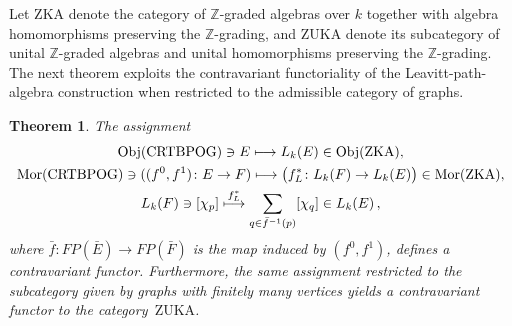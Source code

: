 \documentclass[12pt,times,a4paper]{amsart}
\newtheorem{theorem}{Theorem}[section]
\numberwithin{equation}{section}
\numberwithin{equation}{section}
\begin{document}
Let $\mathrm{ZKA}$ denote the category of $\mathbb{Z}$-graded algebras over $k$ together with algebra homomorphisms 
preserving the $\mathbb{Z}$-grading, and $\mathrm{ZUKA}$ denote its subcategory of unital $\mathbb{Z}$-graded algebras and 
unital homomorphisms preserving the $\mathbb{Z}$-grading. The next theorem exploits the contravariant functoriality of the 
Leavitt-path-algebra construction when restricted to the admissible category of graphs. %
\begin{theorem}\label{contralthm}
 The assignment
\begin{gather*}
\mathrm{Obj}({\rm CRTBPOG})\ni E\stackrel{}{\longmapsto}L_k(E)\in\mathrm{Obj}(\mathrm{ZKA}),\nonumber\\
\mathrm{Mor}({\rm CRTBPOG})\ni ((f^0,f^1)\colon E\to F)
\stackrel{}{\longmapsto}\big({f}^*_L\colon L_k(F)\to L_k(E)\big)\in\mathrm{Mor}(\mathrm{ZKA}),
\nonumber\\
L_k(F)\ni [\chi_p]\stackrel{{f}^*_L}{\longmapsto}\sum_{q\in \bar{f}^{-1}(p)}[\chi_q]\in L_k(E)\,,\label{lsum}
\nonumber
\end{gather*}
where $\bar{f}\colon FP(\bar{E})\to FP(\bar{F})$ is the map induced by $(f^0,f^1)$, defines a contravariant functor. Furthermore, 
the same assignment restricted to the subcategory 
given by graphs with finitely many vertices yields a contravariant functor to the category~$\mathrm{ZUKA}$. 
\end{theorem}
\end{document}
